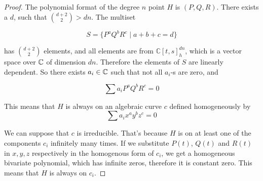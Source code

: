 \documentclass[a4paper]{article}
\begin{document}
\begin{proof}
    The polynomial format of the degree $n$ point $H$ is $(P,Q,R)$.
    There exists a $d$, such that $\binom{d+2}{2} > dn$. The multiset

    $$S=\{P^aQ^bR^c \mid a+b+c=d\}$$

    has $\binom{d+2}{2}$ elements, and all elements are from $\mathbb{C}[t,s]_h^{dn}$, which is a vector space over $\mathbb{C}$ of dimension $dn$. Therefore the elements of $S$ are linearly dependent. So there exists $a_i\in \mathbb{C}$ such that not all $a_i$-s are zero, and

    $$\sum a_iP^aQ^bR^c=0$$

    This means that $H$ is always on an algebraic curve $c$ defined homogeneously by $$\sum a_ix^ay^bz^c=0$$







    We can suppose that $c$ is irreducible. That's because $H$ is on at least one of the components $c_i$ infinitely many times. If we substitute $P(t)$, $Q(t)$ and $R(t)$ in $x,y,z$ respectively in the homogenous form of $c_i$, we get a homogeneous bivariate polynomial, which has infinite zeros, therefore it is constant zero. This means that $H$ is always on $c_i$.


\end{proof}
\end{document}
